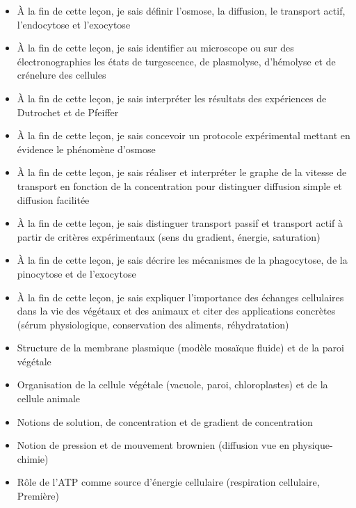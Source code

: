 \documentclass[11pt]{article}
\begin{document}
\begin{objectifs}
\begin{itemize}
\item À la fin de cette leçon, je sais définir l'osmose, la diffusion, le transport actif, l'endocytose et l'exocytose
\item À la fin de cette leçon, je sais identifier au microscope ou sur des électronographies les états de turgescence, de plasmolyse, d'hémolyse et de crénelure des cellules
\item À la fin de cette leçon, je sais interpréter les résultats des expériences de Dutrochet et de Pfeiffer
\item À la fin de cette leçon, je sais concevoir un protocole expérimental mettant en évidence le phénomène d'osmose
\item À la fin de cette leçon, je sais réaliser et interpréter le graphe de la vitesse de transport en fonction de la concentration pour distinguer diffusion simple et diffusion facilitée
\item À la fin de cette leçon, je sais distinguer transport passif et transport actif à partir de critères expérimentaux (sens du gradient, énergie, saturation)
\item À la fin de cette leçon, je sais décrire les mécanismes de la phagocytose, de la pinocytose et de l'exocytose
\item À la fin de cette leçon, je sais expliquer l'importance des échanges cellulaires dans la vie des végétaux et des animaux et citer des applications concrètes (sérum physiologique, conservation des aliments, réhydratation)
\end{itemize}
\end{objectifs}

\begin{prerequis}
\begin{itemize}
\item Structure de la membrane plasmique (modèle mosaïque fluide) et de la paroi végétale
\item Organisation de la cellule végétale (vacuole, paroi, chloroplastes) et de la cellule animale
\item Notions de solution, de concentration et de gradient de concentration
\item Notion de pression et de mouvement brownien (diffusion vue en physique-chimie)
\item Rôle de l'ATP comme source d'énergie cellulaire (respiration cellulaire, Première)
\end{itemize}
\end{prerequis}
\end{document}
